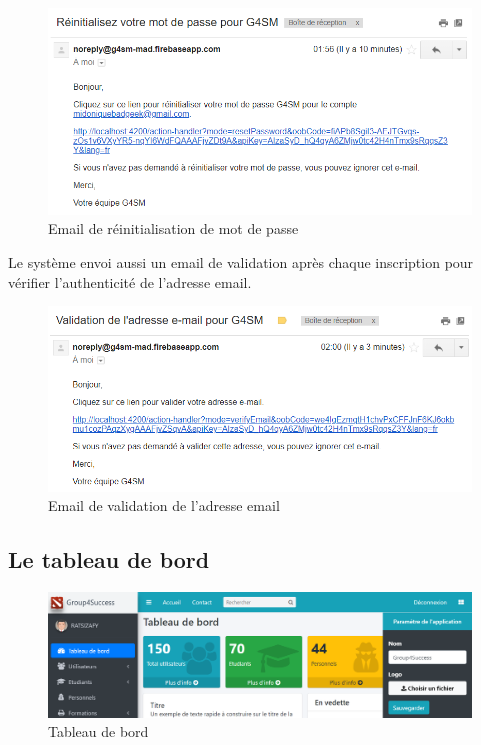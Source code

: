 \begin{figure}[h]
	\centering
	\includegraphics[width=1\linewidth]{"Chapitre5/images/emailReiniatiasationMDP"}
	\caption{Email de réinitialisation de mot de passe}
	\label{Email de réinitialisation de mot de passe}
\end{figure}

Le système envoi aussi un email de validation après chaque inscription pour vérifier l'authenticité de l'adresse email.

\begin{figure}[h]
	\centering
	\includegraphics[width=1\linewidth]{"Chapitre5/images/emailValidation"}
	\caption{Email de validation de l'adresse email}
	\label{Email de validation de l'adresse email}
\end{figure}
\clearpage

\subsection{Le tableau de bord}

\begin{figure}[h]
	\centering
	\hspace*{-1.8cm}
	\includegraphics[width=1.2\linewidth]{"Chapitre5/images/dashboard"}
	\caption{Tableau de bord}
	\label{Tableau de bord}
\end{figure}

